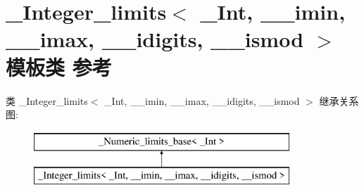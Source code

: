 \hypertarget{class___integer__limits}{}\section{\+\_\+\+Integer\+\_\+limits$<$ \+\_\+\+Int, \+\_\+\+\_\+imin, \+\_\+\+\_\+imax, \+\_\+\+\_\+idigits, \+\_\+\+\_\+ismod $>$ 模板类 参考}
\label{class___integer__limits}
类 \+\_\+\+Integer\+\_\+limits$<$ \+\_\+\+Int, \+\_\+\+\_\+imin, \+\_\+\+\_\+imax, \+\_\+\+\_\+idigits, \+\_\+\+\_\+ismod $>$ 继承关系图\+:\begin{figure}[H]
\begin{center}
\leavevmode
\includegraphics[height=2.000000cm]{class___integer__limits}
\end{center}
\end{figure}
